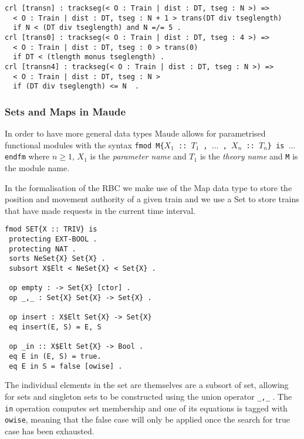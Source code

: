 \begin{lstlisting}[caption = "Rewriting rules for the trackseg operation"]
crl [transn] : trackseg(< O : Train | dist : DT, tseg : N >) => 
  < O : Train | dist : DT, tseg : N + 1 > trans(DT div tseglength) 
  if N < (DT div tseglength) and N =/= 5 .
crl [trans0] : trackseg(< O : Train | dist : DT, tseg : 4 >) => 
  < O : Train | dist : DT, tseg : 0 > trans(0) 
  if DT < (tlength monus tseglength) .
crl [transn4] : trackseg(< O : Train | dist : DT, tseg : N >) => 
  < O : Train | dist : DT, tseg : N >  
  if (DT div tseglength) <= N  .
\end{lstlisting}

\subsubsection*{Sets and Maps in Maude}
In order to have more general data types Maude allows for parametrised functional modules with the  syntax \texttt{fmod M\{$X_1$ :: $T_1$ , $\ldots$ , $X_n$ :: $T_n$\} is $\ldots$ endfm} where $n \geq 1$, $X_1$ is the \emph{parameter name} and $T_1$ is the \emph{theory name} and \texttt{M} is the module name.

In the formalisation of the RBC we make use of the Map data type \cite{MaudeBook} to store the position and movement authority of a given train and we use a Set \cite{MaudeBook} to store trains that have made requests in the current time interval. 

\begin{lstlisting}[caption = The specification of the Set data type in Maude]
fmod SET{X :: TRIV} is 
 protecting EXT-BOOL .
 protecting NAT .
 sorts NeSet{X} Set{X} .
 subsort X$Elt < NeSet{X} < Set{X} .

 op empty : -> Set{X} [ctor] .
 op _,_ : Set{X} Set{X} -> Set{X} .
 
 op insert : X$Elt Set{X} -> Set{X}
 eq insert(E, S) = E, S

 op _in :: X$Elt Set{X} -> Bool .
 eq E in (E, S) = true.
 eq E in S = false [owise] .

\end{lstlisting}

The individual elements in the set are themselves are a subsort of set, allowing for sets and singleton sets to be constructed using the union operator \texttt{\_,\_} . The \texttt{in} operation computes set membership and one of its equations is tagged with \texttt{owise}, meaning that the false case will only be applied once the search for true case has been exhausted.

